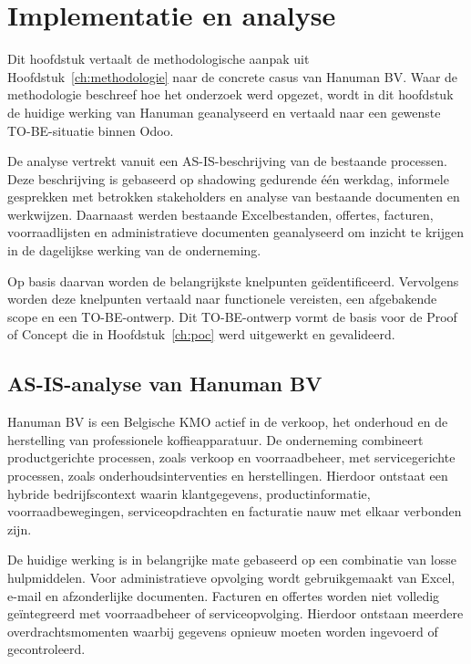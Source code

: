 
\chapter{Implementatie en analyse}
\label{ch:implementatie-analyse}

Dit hoofdstuk vertaalt de methodologische aanpak uit Hoofdstuk~\ref{ch:methodologie} naar de concrete casus van Hanuman BV. Waar de methodologie beschreef hoe het onderzoek werd opgezet, wordt in dit hoofdstuk de huidige werking van Hanuman geanalyseerd en vertaald naar een gewenste TO-BE-situatie binnen Odoo.

De analyse vertrekt vanuit een AS-IS-beschrijving van de bestaande processen. Deze beschrijving is gebaseerd op shadowing gedurende één werkdag, informele gesprekken met betrokken stakeholders en analyse van bestaande documenten en werkwijzen. Daarnaast werden bestaande Excelbestanden, offertes, facturen, voorraadlijsten en administratieve documenten geanalyseerd om inzicht te krijgen in de dagelijkse werking van de onderneming.

Op basis daarvan worden de belangrijkste knelpunten geïdentificeerd. Vervolgens worden deze knelpunten vertaald naar functionele vereisten, een afgebakende scope en een TO-BE-ontwerp. Dit TO-BE-ontwerp vormt de basis voor de Proof of Concept die in Hoofdstuk~\ref{ch:poc} werd uitgewerkt en gevalideerd.

\section{AS-IS-analyse van Hanuman BV}
\label{sec:asis-analyse}

Hanuman BV is een Belgische KMO actief in de verkoop, het onderhoud en de herstelling van professionele koffieapparatuur. De onderneming combineert productgerichte processen, zoals verkoop en voorraadbeheer, met servicegerichte processen, zoals onderhoudsinterventies en herstellingen. Hierdoor ontstaat een hybride bedrijfscontext waarin klantgegevens, productinformatie, voorraadbewegingen, serviceopdrachten en facturatie nauw met elkaar verbonden zijn.

De huidige werking is in belangrijke mate gebaseerd op een combinatie van losse hulpmiddelen. Voor administratieve opvolging wordt gebruikgemaakt van Excel, e-mail en afzonderlijke documenten. Facturen en offertes worden niet volledig geïntegreerd met voorraadbeheer of serviceopvolging. Hierdoor ontstaan meerdere overdrachtsmomenten waarbij gegevens opnieuw moeten worden ingevoerd of gecontroleerd.

